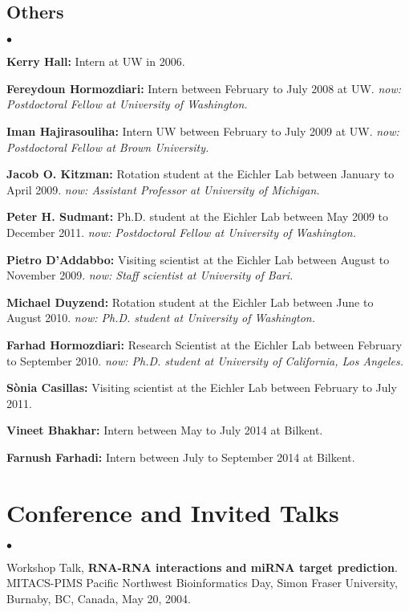 \documentclass[margin,line]{res}
\newenvironment{list2}{
  \begin{list}{$\bullet$}{%
      \setlength{\itemsep}{0in}
      \setlength{\parsep}{0in} \setlength{\parskip}{0in}
      \setlength{\topsep}{0in} \setlength{\partopsep}{0in} 
      \setlength{\leftmargin}{0.2in}}}{\end{list}}
\begin{document}
\begin{resume}
\subsection{\small \sc Others}
\begin{list2}
\item
{\bf Kerry Hall:} Intern at UW in 2006. 
\item
{\bf Fereydoun Hormozdiari:} Intern between February to July 2008 at UW. 
{\it now: Postdoctoral Fellow at University of Washington.}
\item
{\bf Iman Hajirasouliha:}  Intern UW between February to July 2009 at UW.
{\it now: Postdoctoral Fellow at Brown University.}
\item
{\bf Jacob O. Kitzman:} Rotation student at the Eichler Lab between January to April 2009.
{\it now: Assistant Professor at University of Michigan.}
\item
{\bf Peter H. Sudmant:} Ph.D. student at the Eichler Lab between May 2009 to December 2011.
{\it now: Postdoctoral Fellow at University of Washington.}
\item
{\bf Pietro D'Addabbo:} Visiting scientist at the Eichler Lab between August to November 2009.
{\it now: Staff scientist at University of Bari.}
\item
{\bf Michael Duyzend:} Rotation student at the Eichler Lab between June to August 2010.
{\it now: Ph.D. student at University of Washington.}
\item
{\bf Farhad Hormozdiari:} Research Scientist at the Eichler Lab between February to September 2010.
{\it now: Ph.D. student at University of California, Los Angeles.}
\item
{\bf S\`{o}nia Casillas:} Visiting scientist at the Eichler Lab between February to July 2011.
\item
{\bf Vineet Bhakhar:} Intern between May to July 2014 at Bilkent. 
\item
{\bf Farnush Farhadi:} Intern between July to September 2014 at Bilkent. 
\end{list2}


\vspace*{-.2cm}
\section{\sc Conference and Invited Talks}

\begin{list2}
\item
  
  Workshop Talk, {\bf RNA-RNA interactions and miRNA target prediction}.
  MITACS-PIMS Pacific Northwest Bioinformatics Day, Simon Fraser University, Burnaby, BC, Canada, 
  May 20, 2004.


\end{list2}
\end{resume}
\end{document}

